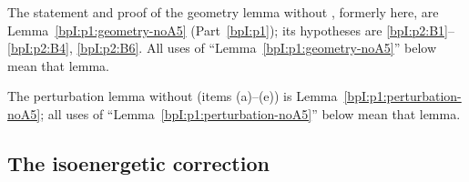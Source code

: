 \begin{remark}\label{bpI:p2:geometry}
The statement and proof of the geometry lemma without , formerly here, are Lemma~\ref{bpI:p1:geometry-noA5} (Part~\ref{bpI:p1}); its hypotheses are
\ref{bpI:p2:B1}--\ref{bpI:p2:B4}, \ref{bpI:p2:B6}. All uses of ``Lemma~\ref{bpI:p1:geometry-noA5}'' below mean that lemma.
\end{remark}

\begin{remark}\label{bpI:p2:perturbation}
The perturbation lemma without  (items (a)--(e)) is Lemma~\ref{bpI:p1:perturbation-noA5}; all uses of ``Lemma~\ref{bpI:p1:perturbation-noA5}'' below mean that lemma.
\end{remark}

\subsection{The isoenergetic correction}\label{bpI:p2:sec-correction}

